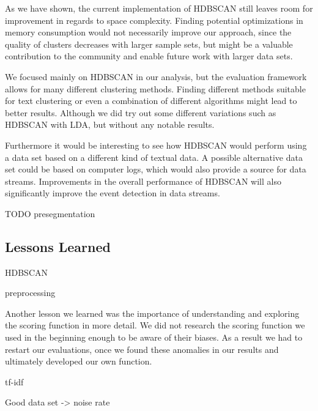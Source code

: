 As we have shown, the current implementation of HDBSCAN
still leaves room for improvement in regards to space complexity.
Finding potential optimizations in memory consumption would not necessarily improve our approach,
since the quality of clusters decreases with larger sample sets,
but might be a valuable contribution to the community and enable future work with larger data sets.

We focused mainly on HDBSCAN in our analysis, but the evaluation framework allows for many different clustering methods.
Finding different methods suitable for text clustering
or even a combination of different algorithms might lead to better results.
Although we did try out some different variations such as HDBSCAN with LDA,
but without any notable results.

Furthermore it would be interesting to see how HDBSCAN would perform
using a data set based on a different kind of textual data.
A possible alternative data set could be based on computer logs,
which would also provide a source for data streams.
Improvements in the overall performance of HDBSCAN will also significantly improve the event detection in data streams.

TODO presegmentation

\subsection{Lessons Learned}
\label{subsec:6_lessons_learned}


HDBSCAN

preprocessing

Another lesson we learned was the importance of understanding and exploring the scoring function in more detail.
We did not research the scoring function we used in the beginning enough to be aware of their biases.
As a result we had to restart our evaluations, once we found these anomalies in our results and 
ultimately developed our own function.  

tf-idf

Good data set -> noise rate
